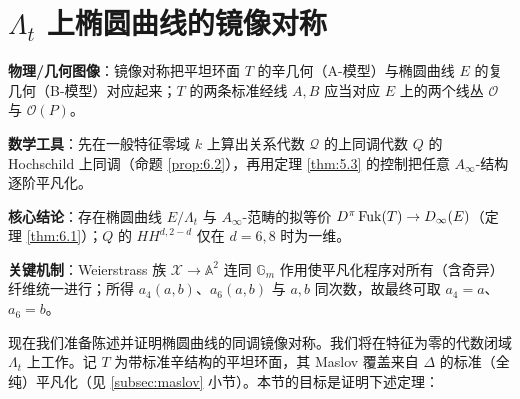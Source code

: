 

\section{\texorpdfstring{$\Lambda_t$ 上椭圆曲线的镜像对称}{Λ_t 上椭圆曲线的镜像对称}}\label{sec:mirror}

\begin{keytakeaways}
  \item \textbf{物理/几何图像}：镜像对称把平坦环面 $T$ 的辛几何（A-模型）与椭圆曲线 $E$ 的复几何（B-模型）对应起来；$T$ 的两条标准经线 $A,B$ 应当对应 $E$ 上的两个线丛 $\mathcal{O}$ 与 $\mathcal{O}(P)$。
  \item \textbf{数学工具}：先在一般特征零域 $k$ 上算出关系代数 $\mathcal{Q}$ 的上同调代数 $Q$ 的 Hochschild 上同调（命题 \ref{prop:6.2}），再用定理 \ref{thm:5.3} 的控制把任意 $A_\infty$-结构逐阶平凡化。
  \item \textbf{核心结论}：存在椭圆曲线 $E/\Lambda_t$ 与 $A_\infty$-范畴的拟等价 $D^\pi\operatorname{Fuk}(T)\to D_\infty(E)$（定理 \ref{thm:6.1}）；$Q$ 的 $HH^{d,2-d}$ 仅在 $d=6,8$ 时为一维。
  \item \textbf{关键机制}：Weierstrass 族 $\mathcal{X}\to\mathbb{A}^2$ 连同 $\mathbb{G}_m$ 作用使平凡化程序对所有（含奇异）纤维统一进行；所得 $a_4(a,b)$、$a_6(a,b)$ 与 $a,b$ 同次数，故最终可取 $a_4=a$、$a_6=b$。
\end{keytakeaways}

现在我们准备陈述并证明椭圆曲线的同调镜像对称。我们将在特征为零的代数闭域 $\Lambda_t$ 上工作。记 $T$ 为带标准辛结构的平坦环面，其 Maslov 覆盖来自 $\Delta$ 的标准（全纯）平凡化（见 \ref{subsec:maslov} 小节）。本节的目标是证明下述定理：


